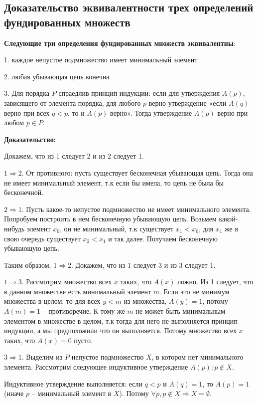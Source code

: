 \subsection{Доказательство эквивалентности трех определений фундированных множеств}

\textbf{Следующие три определения фундированных множеств эквивалентны}:

\hspace{0.5cm}\parbox{17cm} {
    1. каждое непустое подмножество имеет минимальный элемент

    2. любая убывающая цепь конечна

    3. Для порядка $P$ спраедлив принцип индукции: если для утверждения $A(p)$, зависящего от элемента порядка, для любого $p$ верно утверждение «если $A(q)$ верно при всех $q < p$, то и $A(p)$ верно». Тогда утверждение $A(p)$ верно при любом $p \in P$. 
}

\textbf{Доказательство:}

\hspace{0.5cm}\parbox{17cm} {
    Докажем, что из  1 следует 2 и из 2 следует 1.

    $1 \Rightarrow 2$. От противного: пусть существует бесконечная убывающая цепь. Тогда она не имеет минимальный элемент, т.к если бы имела, то цепь не была бы бесконечной.

    $2 \Rightarrow 1$. Пусть какое-то непустое подмножество не имеет минимального элемента. Попробуем построить в нем бесконечную убывающую цепь. Возьмем какой-нибудь элемент $x_0$, он не минимальный, т.к существует $x_1 < x_0$, для $x_1$ же в свою очередь существует $x_2 < x_1$ и так далее. Получаем бесконечную убывающую цепь.

    Таким образом, $1 \Leftrightarrow 2$. Докажем, что из 1 следует 3 и из 3 следует 1.

    $1 \Rightarrow 3$. Рассмотрим множество всех $x$ таких, что $A(x)$ ложно. Из 1 следует, что в данном множестве есть минимальный элемент $m$. Если это не минимум множества в целом. то для всех $y < m$ из множества, $A(y) = 1$, потому $A(m) = 1$ -- противоречие. К тому же $m$ не может быть минимальным элементом в множестве в целом, т.к тогда для него не выполняется принцип индукции, а мы предположили что он выполняется. Потому множество всех $x$ таких, что $A(x) = 0$ пусто.

    $3 \Rightarrow 1$. Выделим из $P$ непустое подмножество $X$, в котором нет минимального элемента. Рассмотрим следующее индуктивное утверждение $A(p): p \notin X$.

    Индуктивное утверждение выполняется: если $q < p$ и $A(q) = 1$, то $A(p) = 1$ (иначе $p$ -- минимальный элемент в $X$). Потому $\forall p, p \notin X \Rightarrow X = \emptyset$.
}
